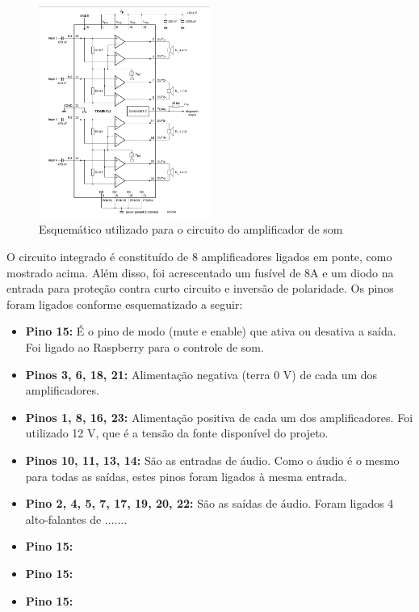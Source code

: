 \begin{figure}[H]
	\centering
    \includegraphics[width=0.5\textwidth]{figuras/circuito_TDA}
    \caption{Esquemático utilizado para o circuito do amplificador de som}
    \label{fig:circuito_TDA}
\end{figure}

O circuito integrado é constituído de 8 amplificadores ligados em ponte, como mostrado acima. Além disso, foi acrescentado um fusível de 8A e um diodo na entrada para proteção contra curto circuito e inversão de polaridade. Os pinos foram ligados conforme esquematizado a seguir:

\begin{itemize}
	\item \textbf{Pino 15:} É o pino de modo (mute e enable) que ativa ou desativa a saída. Foi ligado ao Raspberry para o controle de som.
    \item \textbf{Pinos 3, 6, 18, 21:} Alimentação negativa (terra 0 V) de cada um dos amplificadores.
    \item \textbf{Pinos 1, 8, 16, 23:} Alimentação positiva de cada um dos amplificadores. Foi utilizado 12 V, que é a tensão da fonte disponível do projeto.
    \item \textbf{Pinos 10, 11, 13, 14:} São as entradas de áudio. Como o áudio é o mesmo para todas as saídas, estes pinos foram ligados à mesma entrada.
    \item \textbf{Pino 2, 4, 5, 7, 17, 19, 20, 22:} São as saídas de áudio. Foram ligados 4 alto-falantes de .......
    
    \item \textbf{Pino 15:}
    \item \textbf{Pino 15:}
    \item \textbf{Pino 15:}
\end{itemize}

